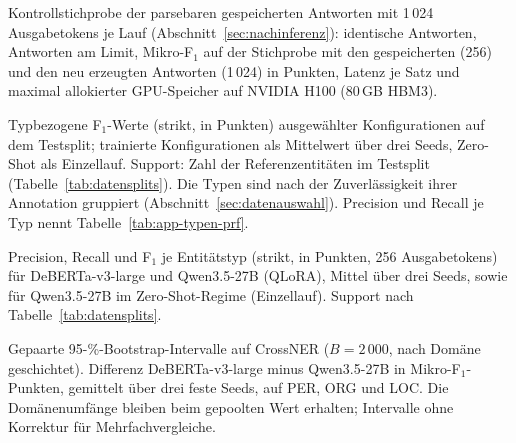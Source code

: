 \begin{table}[ht]
  \centering
  \scriptsize
  \caption[Kontrollstichprobe mit 1\,024 Tokens je Lauf]{Kontrollstichprobe
  der parsebaren gespeicherten Antworten mit 1\,024 Ausgabetokens je Lauf
  (Abschnitt~\ref{sec:nachinferenz}): identische Antworten, Antworten am
  Limit, Mikro-F$_1$ auf der Stichprobe mit den gespeicherten (256) und
  den neu erzeugten Antworten (1\,024) in Punkten, Latenz je Satz und
  maximal allokierter GPU-Speicher auf NVIDIA H100 (80\,GB HBM3).}
  \label{tab:app-kontrolle}
  \setlength{\tabcolsep}{3pt}
  
\end{table}

\begin{table}[ht]
  \centering
  \footnotesize
  \caption[Typbezogene F$_1$-Werte ausgewählter Konfigurationen]{Typbezogene F$_1$-Werte (strikt, in Punkten) ausgewählter
  Konfigurationen auf dem Testsplit; trainierte Konfigurationen als
  Mittelwert über drei Seeds, Zero-Shot als Einzellauf.
  Support: Zahl der Referenzentitäten im Testsplit
  (Tabelle~\ref{tab:datensplits}).
  Die Typen sind nach der Zuverlässigkeit ihrer Annotation gruppiert
  (Abschnitt~\ref{sec:datenauswahl}).
  Precision und Recall je Typ nennt Tabelle~\ref{tab:app-typen-prf}.}
  \label{tab:typen}
  \setlength{\tabcolsep}{3pt}
  
\end{table}

\begin{table}[ht]
  \centering
  \scriptsize
  \caption[Precision, Recall und F$_1$ je Entitätstyp]{Precision, Recall und F$_1$ je Entitätstyp (strikt, in Punkten,
  256 Ausgabetokens) für DeBERTa-v3-large und Qwen3.5-27B (QLoRA), Mittel
  über drei Seeds, sowie für Qwen3.5-27B im Zero-Shot-Regime (Einzellauf).
  Support nach Tabelle~\ref{tab:datensplits}.}
  \label{tab:app-typen-prf}
  \setlength{\tabcolsep}{3pt}
  
\end{table}


\begin{table}[ht]
  \centering
  \footnotesize
  \caption[Bootstrap-Intervalle des Modellvergleichs auf CrossNER]{Gepaarte
  95-\%-Bootstrap-Intervalle auf CrossNER ($B = 2\,000$, nach Domäne
  geschichtet). Differenz DeBERTa-v3-large minus Qwen3.5-27B in
  Mikro-F$_1$-Punkten, gemittelt über drei feste Seeds, auf PER, ORG und
  LOC. Die Domänenumfänge bleiben beim gepoolten Wert erhalten;
  Intervalle ohne Korrektur für Mehrfachvergleiche.}
  \label{tab:crossner-ci}
  \setlength{\tabcolsep}{4pt}
  
\end{table}

